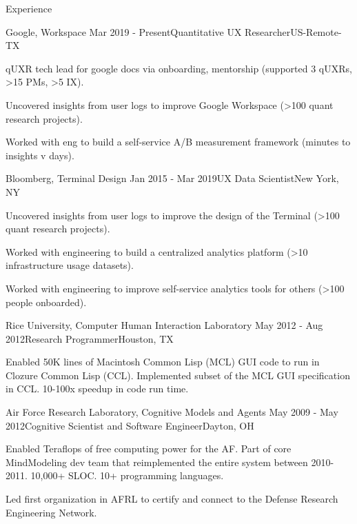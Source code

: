 
\begin{rSection}{Experience}

  \begin{rSubsection}{Google, Workspace}
    {Mar 2019 - Present}{Quantitative UX Researcher}{US-Remote-TX}
  \item qUXR tech lead for google docs via onboarding, mentorship (supported 3 qUXRs, \textgreater15 PMs, \textgreater5 IX).
  \item Uncovered insights from user logs to improve Google Workspace (\textgreater100 quant research projects).
  \item Worked with eng to build a self-service A/B measurement framework (minutes to insights v days).
  \end{rSubsection}

  \begin{rSubsection}{Bloomberg, Terminal Design}
    {Jan 2015 - Mar 2019}{UX Data Scientist}{New York, NY}
    \item Uncovered insights from user logs to improve the design of the Terminal (\textgreater100 quant research projects).
    \item Worked with engineering to build a centralized analytics platform (\textgreater10 infrastructure usage datasets).
    \item Worked with engineering to improve self-service analytics tools for others (\textgreater100 people onboarded). 
  \end{rSubsection}

  \begin{rSubsection}{Rice University, Computer Human Interaction Laboratory}
    {May 2012 - Aug 2012}{Research Programmer}{Houston, TX}
  \item Enabled 50K lines of Macintosh Common Lisp (MCL) GUI code to run in Clozure Common Lisp (CCL).
    Implemented subset of the MCL GUI specification in CCL. 10-100x speedup in code run time. 
  \end{rSubsection}

  \begin{rSubsection}{Air Force Research Laboratory, Cognitive Models and Agents}
    {May 2009 - May 2012}{Cognitive Scientist and Software Engineer}{Dayton, OH}
  \item 
    Enabled Teraflops of free computing power for the AF.
    Part of core MindModeling dev team that reimplemented the entire system between 2010-2011.
    10,000+ SLOC. 10+ programming languages. 
  \item
    Led first organization in AFRL to certify and connect to the Defense Research Engineering Network.
  \end{rSubsection}


\end{rSection}

